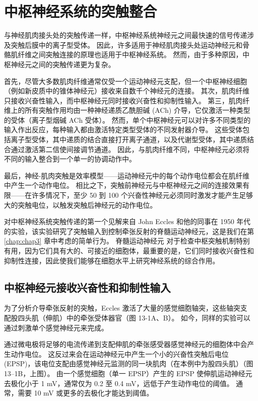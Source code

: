 \chapter{中枢神经系统的突触整合} \label{chap:chap13}
与神经肌肉接头处的突触传递一样，中枢神经系统神经元之间最快速的信号传递涉及突触后膜中的离子型受体。 
因此，许多适用于神经肌肉接头处运动神经元和骨骼肌纤维之间突触连接的原理也适用于中枢神经系统。
然而，由于多种原因，中枢神经元之间的突触传递更为复杂。


首先，尽管大多数肌肉纤维通常仅受一个运动神经元支配，但一个中枢神经细胞（例如新皮质中的锥体神经元）接收来自数千个神经元的连接。 
其次，肌肉纤维只接收兴奋性输入，而中枢神经元同时接收兴奋性和抑制性输入。 
第三，肌肉纤维上的所有突触作用均由一种神经递质乙酰胆碱 (ACh) 介导，它仅激活一种类型的受体（离子型烟碱 ACh 受体）。 
然而，单个中枢神经元可以对许多不同类型的输入作出反应，每种输入都由激活特定类型受体的不同发射器介导。 
这些受体包括离子型受体，其中递质的结合直接打开离子通道，以及代谢型受体，其中递质结合通过激活第二信使间接调节通道。 
因此，与肌肉纤维不同，中枢神经元必须将不同的输入整合到一个单一的协调动作中。


最后，神经-肌肉突触是效率模型——运动神经元中的每个动作电位都会在肌纤维中产生一个动作电位。 
相比之下，突触前神经元与中枢神经元之间的连接效果有限——在许多情况下，至少 50 到 100 个兴奋性神经元必须同时激发才能产生足够大的突触电位，以触发突触后神经元的动作电位。


对中枢神经系统突触传递的第一个见解来自 John Eccles 和他的同事在 1950 年代的实验，该实验研究了突触输入到控制牵张反射的脊髓运动神经元，这是我们在第 \ref{chap:chap3} 章中考虑的简单行为。
脊髓运动神经元 对于检查中枢突触机制特别有用，因为它们具有大的、可接近的细胞体，最重要的是，它们同时接收兴奋性和抑制性连接，因此使我们能够在细胞水平上研究神经系统的综合作用。



\section{中枢神经元接收兴奋性和抑制性输入}

为了分析介导牵张反射的突触，Eccles 激活了大量的感觉细胞轴突，这些轴突支配股四头肌（伸肌）中的牵张受体器官（图 13-1A、B）。 
如今，同样的实验可以通过刺激单个感觉神经元来完成。


通过微电极将足够的电流传递到支配伸肌的牵张感受器感觉神经元的细胞体中会产生动作电位。 
这反过来会在运动神经元中产生一个小的兴奋性突触后电位 (EPSP)，该电位支配由感觉神经元监测的同一块肌肉（在本例中为股四头肌）（图 13–1B，上图）。 
由一个感觉细胞（单一 EPSP）产生的 EPSP 使伸肌运动神经元去极化小于 1 mV，通常仅为 0.2 至 0.4 mV，远低于产生动作电位的阈值。 
通常，需要 10 mV 或更多的去极化才能达到阈值。


